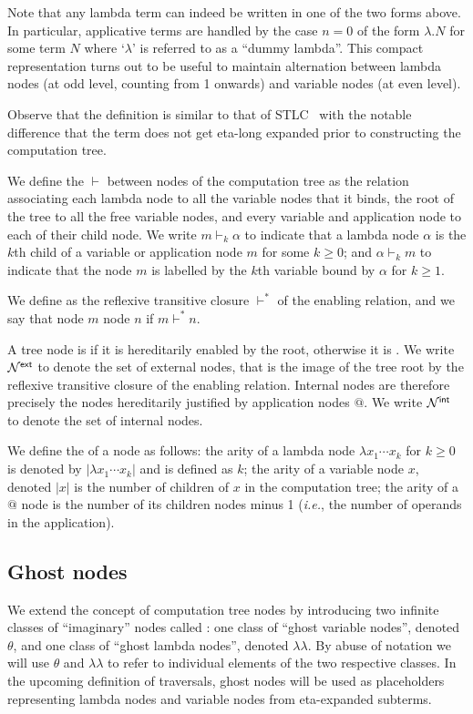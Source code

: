 \documentclass{article}
\makeatletter
\theoremstyle{definition}
\newcommand\Nodes{\mathcal{N}}%
\newcommand{\ghostlmd}{{\lambda\!\!\lambda}}
\newcommand{\ghostvar}{\theta}
\newcommand{\enables}{\vdash} %
\newcommand{\ExtNodes}{\Nodes^{\sf ext}}
\newcommand{\IntNodes}{\Nodes^{\sf int}}
\renewcommand\ie{{\it i.e.\@\xspace}}
\makeatother
\begin{document}
Note that any lambda term can indeed be written in one of the two forms above. In particular, applicative terms are handled by the case $n=0$ of the form $\lambda . N$ for some term $N$ where `$\lambda$' is referred to as a ``dummy lambda''. This compact representation turns out to be useful to maintain alternation between lambda nodes (at odd level, counting from 1 onwards) and variable nodes (at even level).

Observe that the definition is similar to that of STLC~\cite{Ong2006, BlumPhd} with the notable difference that the term does not get eta-long expanded prior to constructing the computation tree.

We define the  $\enables$ between nodes of the computation tree as the relation associating each lambda node to all the variable nodes that it binds, the root of the tree to all the free variable nodes, and every variable and application node to each of their child node. We write $m \enables_k \alpha$ to indicate that a lambda node $\alpha$ is the $k$th child of a variable or application node $m$ for some $k\geq0$; and $\alpha \enables_k m$ to indicate that the node $m$ is labelled by the $k$th variable bound by $\alpha$ for $k\geq1$.

We define  as the reflexive transitive closure $\enables^*$ of the enabling relation, and we say that node $m$  node $n$ if $m \enables^* n$.

A tree node is  if it is hereditarily enabled by the root, otherwise it is . We write $\ExtNodes$ to denote the set of external nodes, that is the image of the tree root by the reflexive transitive closure of the enabling relation. Internal nodes are therefore precisely the nodes hereditarily justified by application nodes $@$. We write $\IntNodes$ to denote the set of internal nodes.

We define the  of a node as follows: the arity of a lambda node $\lambda x_1 \cdots x_k$ for $k\geq 0$ is denoted by $|\lambda x_1 \cdots x_k|$ and is defined as $k$; the arity of a variable node $x$, denoted $|x|$ is the number of children of $x$ in the computation tree; the arity of a $@$ node is the number of its children nodes minus 1 (\ie, the number of operands in the application).

\subsection{Ghost nodes}
We extend the concept of computation tree nodes by introducing two infinite classes of ``imaginary'' nodes called :
one class of ``ghost variable nodes'', denoted $\ghostvar$, and one class of ``ghost lambda nodes'', denoted $\ghostlmd$. By abuse of notation we will use $\ghostvar$ and $\ghostlmd$ to refer to individual elements of the two respective classes. In the upcoming definition of traversals, ghost nodes will be used as placeholders representing lambda nodes and variable nodes from eta-expanded subterms.
\end{document}
